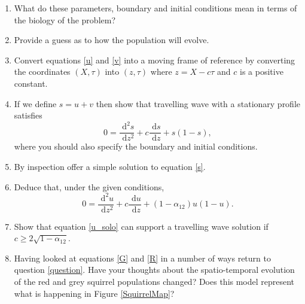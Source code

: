 \documentclass[10pt]{article}
\newcommand{\bb}{\begin{equation}}
\newcommand{\ee}{\end{equation}}
\newcommand{\rd}{\text{ d}}
\newcommand{\fig}[1]{Figure \ref{#1}}
\newcommand{\eqn}[1]{equation \eqref{#1}}
\newcommand{\eqns}[2]{equations \eqref{#1} and \eqref{#2}}
\newcounter{Counter1}
\begin{document}
\begin{enumerate}
\setcounter{enumi}{\value{Counter1}}
\item What do these parameters, boundary and initial conditions mean in terms of the biology of the problem?

\item  Provide a guess as to how the population will evolve.\label{question}

\item Convert \eqns{u}{v} into a moving frame of reference by converting the coordinates $(X,\tau)$ into $(z,\tau)$ where $z=X-c\tau$ and $c$ is a positive constant.

\item If we define $s=u+v$ then show that travelling wave with a stationary profile satisfies
\bb
0=\frac{\rd^2 s}{\rd z^2}+c\frac{\rd s}{\rd z}+s(1-s),\label{s}
\ee
where you should also specify the boundary and initial conditions.

\item By inspection offer a simple solution to \eqn{s}.

\item Deduce that, under the given conditions,
\bb
0=\frac{\rd^2 u}{\rd z^2}+c\frac{\rd u}{\rd z}+(1-\alpha_{12})u(1-u)\label{u_solo}.
\ee


\item Show that \eqn{u_solo} can support a travelling wave solution if $c\geq 2\sqrt{1-\alpha_{12}}$.


\item Having looked at \eqns{G}{R} in a number of ways return to question \ref{question}. Have your thoughts about the spatio-temporal evolution of the red and grey squirrel populations changed? Does this model represent what is happening in \fig{SquirrelMap}?
\end{enumerate}
\end{document}
